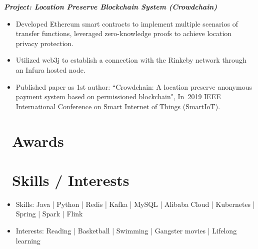 \documentclass{resume}
\begin{document}

\textit{\textbf{\hspace{1em}Project: Location Preserve Blockchain System (Crowdchain)}}
\setlength{\parindent}{0em}

\begin{itemize}
  \item Developed Ethereum smart contracts to implement multiple scenarios of transfer functions, leveraged zero-knowledge proofs to achieve location privacy protection.
  \item Utilized web3j to establish a connection with the Rinkeby network through an Infura hosted node.
  \item Published paper as 1st author: ``Crowdchain: A location preserve anonymous payment system based on permissioned blockchain", In 2019 IEEE International Conference on Smart Internet of Things (SmartIoT).
\end{itemize}


\section{\faTrophy\ Awards}


\section{\faCogs\ Skills / Interests}
\begin{itemize}%
\item Skills: Java | Python | Redis | Kafka | MySQL | Alibaba Cloud | Kubernetes | Spring | Spark | Flink
\item Interests: Reading | Basketball | Swimming | Gangster movies | Lifelong learning
\end{itemize}
\end{document}

